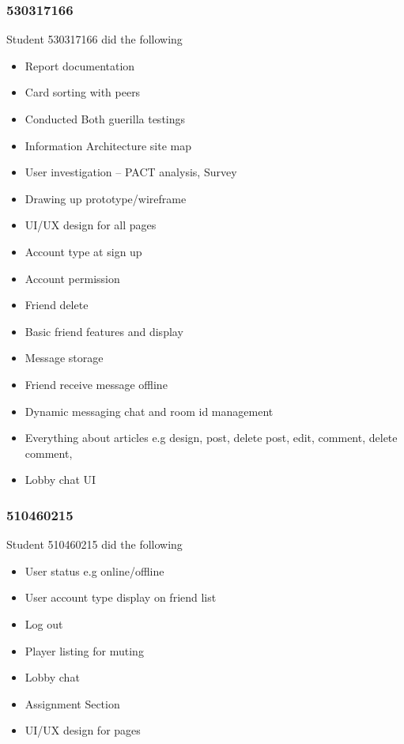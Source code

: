 \documentclass[12pt,a4paper]{article}
\begin{document}
\subsubsection*{530317166}
Student 530317166 did the following
\begin{itemize}
    \item Report documentation
    \item Card sorting with peers
    \item Conducted Both guerilla testings
    \item Information Architecture site map
    \item User investigation – PACT analysis, Survey
    \item Drawing up prototype/wireframe
    \item UI/UX design for all pages
    \item Account type at sign up
    \item Account permission 
    \item Friend delete
    \item Basic friend features and display
    \item Message storage 
    \item Friend receive message offline
    \item Dynamic messaging chat and room id management
    \item Everything about articles e.g design, post, delete post, edit, comment, delete comment, 
    \item Lobby chat UI
\end{itemize}

\subsubsection*{510460215}
Student 510460215 did the following
\begin{itemize}
    \item User status e.g online/offline
    \item User account type display on friend list
    \item Log out
    \item Player listing for muting 
    \item Lobby chat 
    \item Assignment Section
    \item UI/UX design for pages
\end{itemize}
\end{document}
